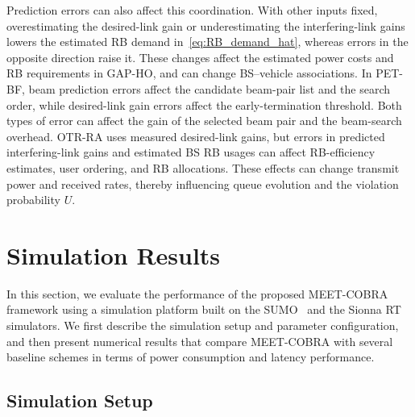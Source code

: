 \documentclass[10pt,journal,letterpaper]{IEEEtran}
\newcommand{\rev}[1]{\textcolor{revisioncolor}{{}#1}}
\theoremstyle{remark}
\begin{document}
\rev{Prediction errors can also affect this coordination. With other inputs fixed, overestimating the desired-link gain or underestimating the interfering-link gains lowers the estimated RB demand in~\eqref{eq:RB_demand_hat}, whereas errors in the opposite direction raise it. These changes affect the estimated power costs and RB requirements in GAP-HO, and can change BS--vehicle associations. In PET-BF, beam prediction errors affect the candidate beam-pair list and the search order, while desired-link gain errors affect the early-termination threshold. Both types of error can affect the gain of the selected beam pair and the beam-search overhead. OTR-RA uses measured desired-link gains, but errors in predicted interfering-link gains and estimated BS RB usages can affect RB-efficiency estimates, user ordering, and RB allocations. These effects can change transmit power and received rates, thereby influencing queue evolution and the violation probability $U$.}

\section{Simulation Results}

In this section, we evaluate the performance of the proposed MEET-COBRA framework using a simulation platform built on the SUMO~\cite{behrisch2011sumo} and the Sionna RT~\cite{sionnaRT} simulators.
We first describe the simulation setup and parameter configuration, and then present numerical results that compare MEET-COBRA with several baseline schemes in terms of power consumption and latency performance.

\subsection{Simulation Setup}
\end{document}

